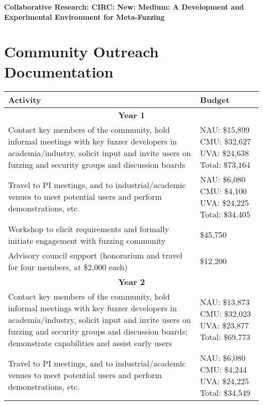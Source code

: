 \documentclass[12pt]{article}
\begin{document}
\begin{center} {\Large\sf\textbf{Collaborative Research: CIRC: New: Medium: A
      Development and Experimental Environment for Meta-Fuzzing}}
\end{center}

\section*{Community Outreach Documentation}


\begin{table}
  \begin{tabular}{|p{12cm}|p{3cm}|}
    \hline
    {\bf Activity} & {\bf Budget} \\
    \hline 
    \multicolumn{2}{c}{{\bf Year 1}} \\
    \hline
    Contact key members of the community, hold informal meetings with
    key fuzzer developers in academia/industry, solicit input and
    invite users
    on fuzzing and security groups and discussion boards &  NAU: \$15,899 CMU: \$32,627 UVA: \$24,638
                                                      Total:  \$73,164 \\
    \hline
    Travel to PI meetings, and to industrial/academic venues to meet
    potential users and perform demonstrations, etc. & NAU: \$6,080
                                                       CMU: \$4,100 UVA:
                                                       \$24,225 Total: \$34,405\\
    \hline
    Workshop to elicit requirements and formally initiate engagement
    with fuzzing community & \$45,750 \\
    \hline 
    Advisory council support (honorarium and travel for four members, 
    at \$2,000 each) & \$12,200 \\
    \hline
    \hline
    \multicolumn{2}{c}{{\bf Year 2}} \\
    \hline
    \hline
    Contact key members of the community, hold informal meetings with
    key fuzzer developers in academia/industry, solicit input and
    invite users
    on fuzzing and security groups and discussion boards; demonstrate
    capabilities and assist early users&  NAU:  \$13,873 CMU:  \$32,023 UVA: \$23,877
                                                      Total: \$69,773  \\
    \hline
    Travel to PI meetings, and to industrial/academic venues to meet
    potential users and perform demonstrations, etc. & NAU: \$6,080 CMU: \$4,244 UVA:  \$24,225 Total: \$34,549\\

\end{tabular}
\end{table}
\end{document}
